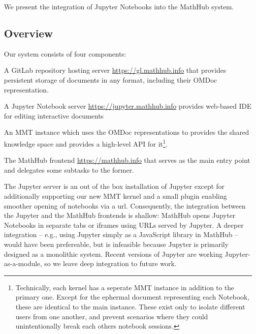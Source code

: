We present the integration of Jupyter Notebooks into the MathHub system.

\subsection{Overview}

Our system consists of four components:
\begin{compactitem}
\item A GitLab repository hosting server \url{https://gl.mathhub.info} that provides persistent storage of documents in any format, including their OMDoc representation.
\item A Jupyter Notebook server \url{https://jupyter.mathhub.info} provides web-based IDE for editing interactive documents
\item An MMT instance which uses the OMDoc representations to provides the shared knowledge space and provides a high-level API for it\footnote{
    Technically, each kernel has a seperate MMT instance in addition to the primary one. 
    Except for the ephermal document representing each Notebook, these are identical to the main instance. 
    These exist only to isolate different users from one another, and prevent scenarios where they could unintentionally break each others notebook sessions.  
  }.
  \item The MathHub frontend \url{https://mathhub.info} that serves as the main entry point and delegates some subtasks to the former.
\end{compactitem}

The Jupyter server is an out of the box installation of Jupyter except for additionally supporting our new MMT kernel and a small plugin enabling smoother opening of notebooks via a url. 
Consequently, the integration between the Jupyter and the MathHub frontends is shallow: MathHub opens Jupyter Notebooks in separate tabs or iframes using URLs served by Jupyter.
A deeper integration -- e.g., using Jupyter simply as a JavaScript library in MathHub -- would have been prefereable, but is infeasible because Jupyter is primarily designed as a monolithic system.
Recent versions of Jupyter are working Jupyter-as-a-module, so we leave deep integration to future work.

